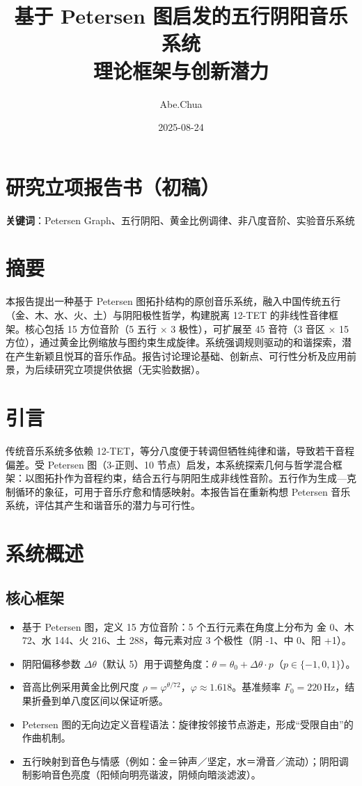 \documentclass{article}
\title{基于 Petersen 图启发的五行阴阳音乐系统\\[6pt] \large 理论框架与创新潜力}
\author{Abe.Chua}
\date{2025-08-24}
\begin{document}
\maketitle

\section*{研究立项报告书（初稿）}
\textbf{关键词}：Petersen Graph、五行阴阳、黄金比例调律、非八度音阶、实验音乐系统

\section*{摘要}
本报告提出一种基于 Petersen 图拓扑结构的原创音乐系统，融入中国传统五行（金、木、水、火、土）与阴阳极性哲学，构建脱离 12-TET 的非线性音律框架。核心包括 15 方位音阶（5 五行 × 3 极性），可扩展至 45 音符（3 音区 × 15 方位），通过黄金比例缩放与图约束生成旋律。系统强调规则驱动的和谐探索，潜在产生新颖且悦耳的音乐作品。报告讨论理论基础、创新点、可行性分析及应用前景，为后续研究立项提供依据（无实验数据）。

\section{引言}
传统音乐系统多依赖 12-TET，等分八度便于转调但牺牲纯律和谐，导致若干音程偏差。受 Petersen 图（3-正则、10 节点）启发，本系统探索几何与哲学混合框架：以图拓扑作为音程约束，结合五行与阴阳生成非线性音阶。五行作为生成—克制循环的象征，可用于音乐疗愈和情感映射。本报告旨在重新构想 Petersen 音乐系统，评估其产生和谐音乐的潜力与可行性。

\section{系统概述}
\subsection{核心框架}
\begin{itemize}
  \item 基于 Petersen 图，定义 15 方位音阶：5 个五行元素在角度上分布为 金 0\textdegree、木 72\textdegree、水 144\textdegree、火 216\textdegree、土 288\textdegree，每元素对应 3 个极性（阴 -1、中 0、阳 +1）。
  \item 阴阳偏移参数 $\Delta\theta$（默认 5\textdegree）用于调整角度：$\theta=\theta_0+\Delta\theta\cdot p$（$p\in\{-1,0,1\}$）。
  \item 音高比例采用黄金比例尺度 $\rho=\varphi^{\theta/72}$，$\varphi\approx1.618$。基准频率 $F_0=220\,$Hz，结果折叠到单八度区间以保证听感。
  \item Petersen 图的无向边定义音程语法：旋律按邻接节点游走，形成“受限自由”的作曲机制。
  \item 五行映射到音色与情感（例如：金＝钟声／坚定，水＝滑音／流动）；阴阳调制影响音色亮度（阳倾向明亮谐波，阴倾向暗淡滤波）。
\end{itemize}
\end{document}
